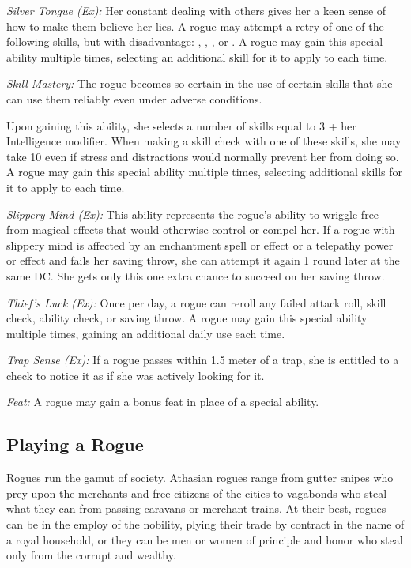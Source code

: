 \textit{Silver Tongue (Ex):} Her constant dealing with others gives her a keen sense of how to make them believe her lies. A rogue may attempt a retry of one of the following skills, but with disadvantage: , , , or . A rogue may gain this special ability multiple times, selecting an additional skill for it to apply to each time.

\textit{Skill Mastery:} The rogue becomes so certain in the use of certain skills that she can use them reliably even under adverse conditions.

Upon gaining this ability, she selects a number of skills equal to 3 + her Intelligence modifier. When making a skill check with one of these skills, she may take 10 even if stress and distractions would normally prevent her from doing so. A rogue may gain this special ability multiple times, selecting additional skills for it to apply to each time.

\textit{Slippery Mind (Ex):} This ability represents the rogue's ability to wriggle free from magical effects that would otherwise control or compel her. If a rogue with slippery mind is affected by an enchantment spell or effect or a telepathy power or effect and fails her saving throw, she can attempt it again 1 round later at the same DC. She gets only this one extra chance to succeed on her saving throw.

\textit{Thief's Luck (Ex):} Once per day, a rogue can reroll any failed attack roll, skill check, ability check, or saving throw. A rogue may gain this special ability multiple times, gaining an additional daily use each time.

\textit{Trap Sense (Ex):} If a rogue passes within 1.5 meter of a trap, she is entitled to a  check to notice it as if she was actively looking for it.

\textit{Feat:} A rogue may gain a bonus feat in place of a special ability.

\subsection{Playing a Rogue}
Rogues run the gamut of society. Athasian rogues range from gutter snipes who prey upon the merchants and free citizens of the cities to vagabonds who steal what they can from passing caravans or merchant trains. At their best, rogues can be in the employ of the nobility, plying their trade by contract in the name of a royal household, or they can be men or women of principle and honor who steal only from the corrupt and wealthy.

